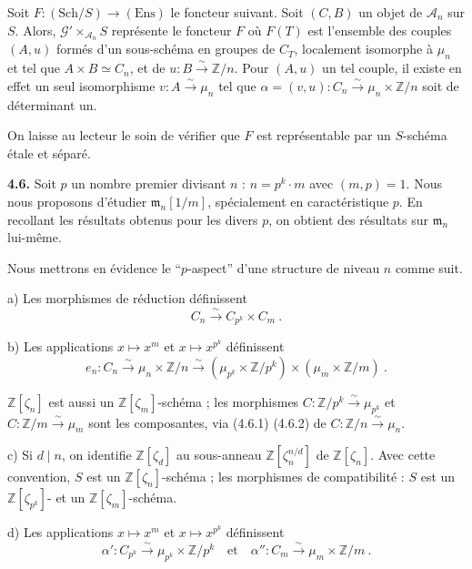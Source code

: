 \documentclass[10pt,a4paper]{amsart}
\theoremstyle{plain}
\theoremstyle{definition}
\newcommand{\m}{\mathfrak{m}}
\newcommand{\cA}{\mathcal{A}}
\newcommand{\cG}{\mathcal{G}}
\newcommand{\ZZ}{\mathbb{Z}}
\begin{document}
Soit $F : (\text{Sch}/S) \to (\text{Ens})$ le foncteur suivant. Soit $(C,B)$ un objet de $\cA_n$ sur $S$. Alors, $\cG' \times_{\cA_n} S$ repr\'esente le foncteur $F$ o\`u $F(T)$ est l'ensemble des couples $(A,u)$ form\'es d'un sous-sch\'ema en groupes de $C_T$, localement isomorphe \`a $\mu_n$ et tel que $A \times B \simeq C_n$, et de $u : B \xrightarrow{\sim} \ZZ/n$. Pour $(A,u)$ un tel couple, il existe en effet un seul isomorphisme $v : A \xrightarrow{\sim} \mu_n$ tel que $\alpha = (v,u) : C_n \xrightarrow{\sim} \mu_n \times \ZZ/n$ soit de d\'eterminant un.

On laisse au lecteur le soin de v\'erifier que $F$ est repr\'esentable par un $S$-sch\'ema \'etale et s\'epar\'e.

\medskip\noindent\textbf{4.6.} Soit $p$ un nombre premier divisant $n$ : $n = p^k \cdot m$ avec $(m,p) = 1$. Nous nous proposons d'\'etudier $\m_n[1/m]$, sp\'ecialement en caract\'eristique $p$. En recollant les r\'esultats obtenus pour les divers $p$, on obtient des r\'esultats sur $\m_n$ lui-m\^eme.

Nous mettrons en \'evidence le ``$p$-aspect'' d'une structure de niveau $n$ comme suit.

a) Les morphismes de r\'eduction d\'efinissent
\begin{equation}
C_n \xrightarrow{\sim} C_{p^k} \times C_m\ .
\end{equation}

b) Les applications $x \mapsto x^m$ et $x \mapsto x^{p^k}$ d\'efinissent
\begin{equation}
e_n : C_n \xrightarrow{\sim} \mu_n \times \ZZ/n \xrightarrow{\sim} (\mu_{p^k} \times \ZZ/p^k) \times (\mu_m \times \ZZ/m)\ .
\end{equation}

$\ZZ[\zeta_n]$ est aussi un $\ZZ[\zeta_m]$-sch\'ema ; les morphismes $C : \ZZ/p^k \xrightarrow{\sim} \mu_{p^k}$ et $C : \ZZ/m \xrightarrow{\sim} \mu_m$ sont les composantes, via (4.6.1) (4.6.2) de $C : \ZZ/n \xrightarrow{\sim} \mu_n$.

c) Si $d \mid n$, on identifie $\ZZ[\zeta_d]$ au sous-anneau $\ZZ[\zeta_n^{n/d}]$ de $\ZZ[\zeta_n]$. Avec cette convention, $S$ est un $\ZZ[\zeta_n]$-sch\'ema ; les morphismes de compatibilit\'e : $S$ est un $\ZZ[\zeta_{p^k}]$- et un $\ZZ[\zeta_m]$-sch\'ema.

d) Les applications $x \mapsto x^m$ et $x \mapsto x^{p^k}$ d\'efinissent
\begin{equation}
\alpha' : C_{p^k} \xrightarrow{\sim} \mu_{p^k} \times \ZZ/p^k\quad \text{et}\quad \alpha'' : C_m \xrightarrow{\sim} \mu_m \times \ZZ/m\ .
\end{equation}
\end{document}
